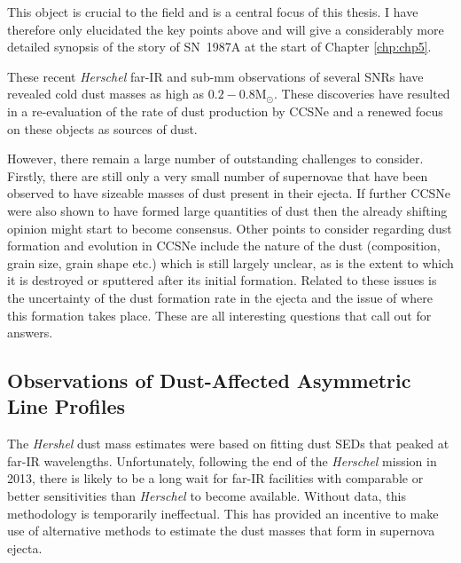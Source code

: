  This object is crucial to the field and is a central focus of this thesis.  I have therefore only elucidated the key points above and will give a considerably more detailed synopsis of the story of SN~1987A at the start of Chapter \ref{chp:chp5}.
 
\vspace{3ex}
\noindent These recent {\em Herschel} far-IR and sub-mm observations of several SNRs have revealed cold dust masses as high as $0.2-0.8$M$_{\odot}$.  These discoveries have resulted in a re-evaluation of the rate of dust production by CCSNe and a renewed focus on these objects as sources of dust.

However, there remain a large number of outstanding challenges to consider.  Firstly, there are still only a very small number of supernovae that have been observed to have sizeable masses of dust present in their ejecta.  If further CCSNe were also shown to have formed large quantities of dust then the already shifting opinion might start to become consensus.  Other points to consider regarding dust formation and evolution in CCSNe include the nature of the dust (composition, grain size, grain shape etc.) which is still largely unclear, as is the extent to which it is destroyed or sputtered after its initial formation.  Related to these issues is the uncertainty of the dust formation rate in the ejecta and the issue of where this formation takes place.  These are all interesting questions that call out for answers.  

 \subsection{Observations of Dust-Affected Asymmetric Line Profiles}

The {\em Hershel} dust mass estimates were based on fitting dust SEDs that peaked at far-IR wavelengths. Unfortunately, following the end of the {\em Herschel} mission in 2013, there is likely to be a long wait for far-IR facilities with comparable or better sensitivities than {\em Herschel} to become available.  Without data, this methodology is temporarily ineffectual.  This has provided an incentive to make use of alternative methods to estimate the dust masses that form in supernova ejecta.

